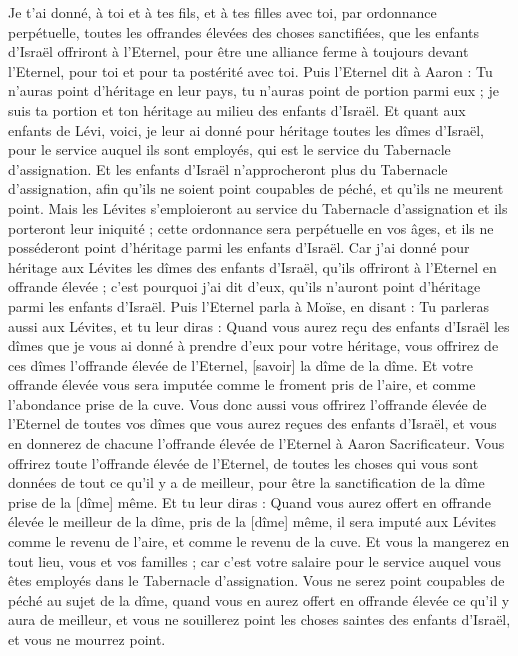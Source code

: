 \begin{multicols}{2}
Je t'ai donné, à toi et à tes fils, et à tes filles avec toi, par ordonnance perpétuelle, toutes les offrandes élevées des choses sanctifiées, que les enfants d'Israël offriront à l'Eternel, pour être une alliance ferme à toujours devant l'Eternel, pour toi et pour ta postérité avec toi.
Puis l'Eternel dit à Aaron : Tu n'auras point d'héritage en leur pays, tu n'auras point de portion parmi eux ; je suis ta portion et ton héritage au milieu des enfants d'Israël.
Et quant aux enfants de Lévi, voici, je leur ai donné pour héritage toutes les dîmes d'Israël, pour le service auquel ils sont employés, qui est le service du Tabernacle d'assignation.
Et les enfants d'Israël n'approcheront plus du Tabernacle d'assignation, afin qu'ils ne soient point coupables de péché, et qu'ils ne meurent point.
Mais les Lévites s'emploieront au service du Tabernacle d'assignation et ils porteront leur iniquité ; cette ordonnance sera perpétuelle en vos âges, et ils ne posséderont point d'héritage parmi les enfants d'Israël.
Car j'ai donné pour héritage aux Lévites les dîmes des enfants d'Israël, qu'ils offriront à l'Eternel en offrande élevée ; c'est pourquoi j'ai dit d'eux, qu'ils n'auront point d'héritage parmi les enfants d'Israël.
Puis l'Eternel parla à Moïse, en disant :
Tu parleras aussi aux Lévites, et tu leur diras : Quand vous aurez reçu des enfants d'Israël les dîmes que je vous ai donné à prendre d'eux pour votre héritage, vous offrirez de ces dîmes l'offrande élevée de l'Eternel, [savoir] la dîme de la dîme.
Et votre offrande élevée vous sera imputée comme le froment pris de l'aire, et comme l'abondance prise de la cuve.
Vous donc aussi vous offrirez l'offrande élevée de l'Eternel de toutes vos dîmes que vous aurez reçues des enfants d'Israël, et vous en donnerez de chacune l'offrande élevée de l'Eternel à Aaron Sacrificateur.
Vous offrirez toute l'offrande élevée de l'Eternel, de toutes les choses qui vous sont données de tout ce qu'il y a de meilleur, pour être la sanctification de la dîme prise de la [dîme] même.
Et tu leur diras : Quand vous aurez offert en offrande élevée le meilleur de la dîme, pris de la [dîme] même, il sera imputé aux Lévites comme le revenu de l'aire, et comme le revenu de la cuve.
Et vous la mangerez en tout lieu, vous et vos familles ; car c'est votre salaire pour le service auquel vous êtes employés dans le Tabernacle d'assignation.
Vous ne serez point coupables de péché au sujet de la dîme, quand vous en aurez offert en offrande élevée ce qu'il y aura de meilleur, et vous ne souillerez point les choses saintes des enfants d'Israël, et vous ne mourrez point.

\end{multicols}
